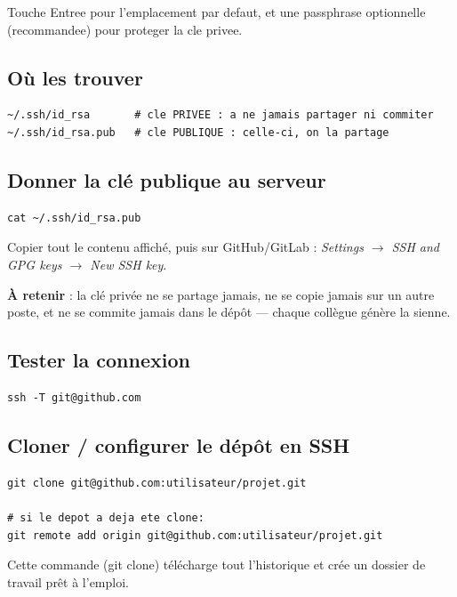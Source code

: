 \documentclass[11pt,a4paper]{article}
\begin{document}
Touche Entree pour l'emplacement par defaut, et une passphrase optionnelle (recommandee) pour proteger la cle privee.

\subsection*{Où les trouver}

\begin{lstlisting}[style=bashstyle]
~/.ssh/id_rsa       # cle PRIVEE : a ne jamais partager ni commiter
~/.ssh/id_rsa.pub   # cle PUBLIQUE : celle-ci, on la partage
\end{lstlisting}

\subsection*{Donner la clé publique au serveur}

\begin{lstlisting}[style=bashstyle]
cat ~/.ssh/id_rsa.pub
\end{lstlisting}

Copier tout le contenu affiché, puis sur GitHub/GitLab : \emph{Settings $\rightarrow$ SSH and GPG keys $\rightarrow$ New SSH key}.

\textbf{À retenir} : la clé privée ne se partage jamais, ne se copie jamais sur un autre poste, et ne se commite jamais dans le dépôt --- chaque collègue génère la sienne.
\subsection*{Tester la connexion}

\begin{lstlisting}[style=bashstyle]
ssh -T git@github.com
\end{lstlisting}

\subsection*{Cloner / configurer le dépôt en SSH}

\begin{lstlisting}[style=bashstyle]
git clone git@github.com:utilisateur/projet.git

# si le depot a deja ete clone:
git remote add origin git@github.com:utilisateur/projet.git
\end{lstlisting}


Cette commande (git clone) télécharge tout l'historique et crée un dossier de travail prêt à l'emploi.
\end{document}
